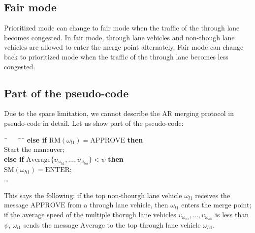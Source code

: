 \documentclass[10pt, conference, compsocconf]{IEEEtran}
\begin{document}
\subsection{Fair mode}

Prioritized mode can change to fair mode when the traffic of the
through lane becomes congested. In fair mode, through lane vehicles
and non-though lane vehicles are allowed to enter the merge point
alternately. Fair mode can change back to prioritized mode when the
traffic of the through lane becomes less congested.

\subsection{Part of the pseudo-code}

Due to the space limitation, we cannot describe the AR merging
protocol in pseudo-code in detail. Let us show part of the pseudo-code:

\begin{small}
\begin{tabbing}
\=\ \ \ \ \=\ \ \=\kill
\>\>\textbf{else if} $\textrm{RM}(\omega_{l1}) = \textrm{APPROVE}$ \textbf{then} \\
\>\>\>Start the maneuver; \\
\>\>\textbf{else if} $\textrm{Average}\{\upsilon_{\omega_{h1}},\ldots,\upsilon_{\omega_{hn}}\}  < \psi$ \textbf{then} \\
\>\>\>$\textrm{SM}(\omega_{h1}) = \textrm{ENTER}$; \\
\>\>\>\ldots
\end{tabbing}
\end{small}

\noindent
This says the following: if the top non-thourgh lane vehicle
$\omega_{l1}$ receives the message $\textrm{APPROVE}$ from a through
lane vehicle, then $\omega_{l1}$ enters the merge point; if the
average speed of the multiple thorugh lane vehicles
$\upsilon_{\omega_{h1}},\ldots,\upsilon_{\omega_{hn}}$ is less than
$\psi$, $\omega_{l1}$ sends the message $\textrm{Average}$ to the top
through lane vehicle $\omega_{h1}$.

\end{document}

